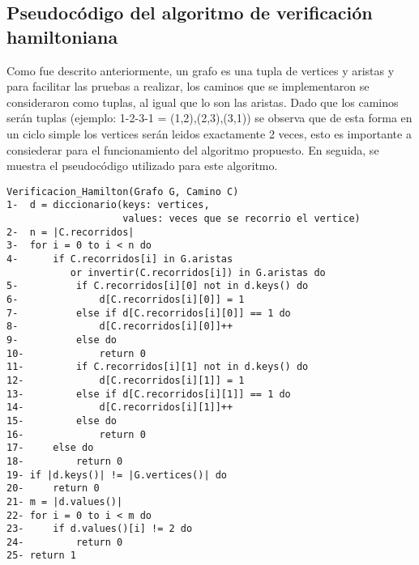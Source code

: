 \documentclass[12pt,twoside]{article}
\begin{document}
\subsection{Pseudocódigo del algoritmo de verificación hamiltoniana}
Como fue descrito anteriormente, un grafo es una tupla de vertices y aristas y para facilitar las pruebas a realizar, los caminos que se implementaron se consideraron como tuplas, al igual que lo son las aristas. Dado que los caminos serán tuplas (ejemplo: 1-2-3-1 = (1,2),(2,3),(3,1)) se observa que de esta forma en un ciclo simple los vertices serán leidos exactamente 2 veces, esto es importante a consiederar para el funcionamiento del algoritmo propuesto. En seguida, se muestra el pseudocódigo utilizado para este algoritmo.
\begin{lstlisting}
Verificacion_Hamilton(Grafo G, Camino C)
1-  d = diccionario(keys: vertices,
                    values: veces que se recorrio el vertice)
2-  n = |C.recorridos|
3-  for i = 0 to i < n do
4-      if C.recorridos[i] in G.aristas
           or invertir(C.recorridos[i]) in G.aristas do
5-          if C.recorridos[i][0] not in d.keys() do
6-              d[C.recorridos[i][0]] = 1
7-          else if d[C.recorridos[i][0]] == 1 do
8-              d[C.recorridos[i][0]]++
9-          else do
10-             return 0
11-         if C.recorridos[i][1] not in d.keys() do
12-             d[C.recorridos[i][1]] = 1
13-         else if d[C.recorridos[i][1]] == 1 do
14-             d[C.recorridos[i][1]]++
15-         else do
16-             return 0
17-     else do
18-         return 0
19- if |d.keys()| != |G.vertices()| do
20-     return 0
21- m = |d.values()|
22- for i = 0 to i < m do
23-     if d.values()[i] != 2 do
24-         return 0
25- return 1
\end{lstlisting}
\end{document}
